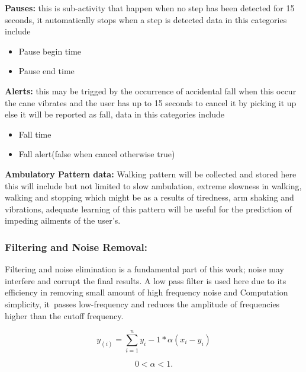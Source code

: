 \documentclass[a4paper, parskip=full]{scrartcl}
\begin{document}
\textbf{Pauses:} this is sub-activity that happen when no step has been detected for 15 seconds, it automatically stops when a step is detected data in this categories include 
\begin{itemize}
	
	\item   Pause begin time
	
	\item   Pause end time	
	
\end{itemize}

\textbf{Alerts:} this may be trigged by the occurrence of accidental fall when this occur the cane vibrates and the user has up to 15 seconds to cancel it by picking it up else it will be reported as fall,  data in this categories include

\begin{itemize}
	\item   Fall time
	
	\item   Fall alert(false when cancel otherwise true)
\end{itemize}
\textbf{Ambulatory Pattern data:} Walking pattern will be collected and stored here this will include but not limited to slow ambulation, extreme slowness in walking, walking and stopping which might be as a results of tiredness, arm shaking and vibrations, adequate learning of this pattern will be useful for the prediction of impeding ailments of the user’s. 

\subsubsection*{Filtering and Noise Removal:} Filtering and noise elimination is a fundamental part of this work; noise may interfere and corrupt the final results. A low pass filter is used here due to its efficiency in removing small amount of high frequency noise and Computation simplicity, it passes low-frequency and reduces the amplitude of frequencies higher than the cutoff frequency.


\[y_{(i)} = \sum_{i =1}^{n}y_i-1 * \alpha(x_i-y_i)\]

\[0 < \alpha< 1.\]
\end{document}
